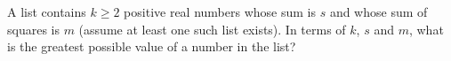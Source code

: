 A list contains $k\ge2$ positive real numbers whose sum is $s$ and whose sum of squares is $m$ (assume at least one such list exists). In terms of $k$, $s$ and $m$, what is the greatest possible value of a number in the list?
